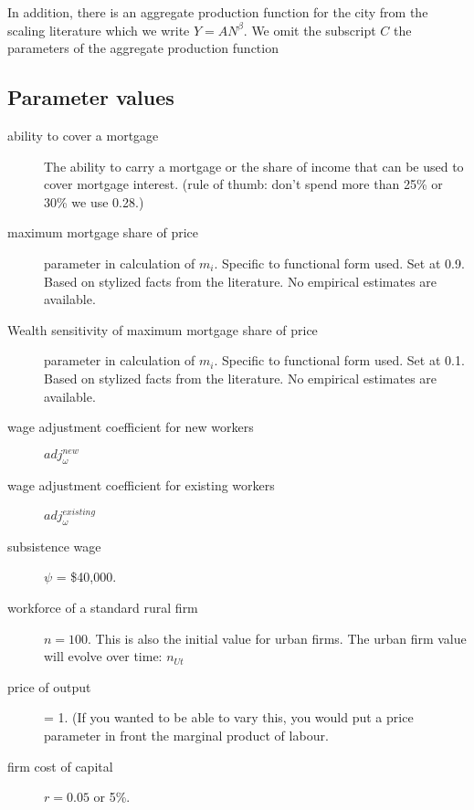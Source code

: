 In addition, there is an aggregate production function for the city from the scaling literature which we write $Y=AN^\beta$. We omit the subscript $C$  the parameters of the aggregate production function

\subsection{Parameter values} \label{sec-param-values}

\begin{description}

\item[\gls{ability to cover a mortgage}] The ability to carry a mortgage or the share of income that can be used to cover mortgage interest. (rule of thumb: don't spend more than 25\% or 30\% we use 0.28.)

\item[maximum mortgage share of price] parameter in calculation of $m_i$. Specific to functional form used. Set at 0.9. Based on stylized facts from the literature.  No empirical estimates are available. 

\item[Wealth sensitivity of maximum mortgage share of price] parameter in calculation of $m_i$. Specific to functional form used. Set at 0.1. Based on stylized facts from the literature.  No empirical estimates are available. 

\item[wage adjustment coefficient for new workers ] $adj^{new}_\omega$

\item[wage adjustment coefficient for existing workers] $adj^{existing}_\omega$

\item  [subsistence wage] $\psi$ = \$40,000. %

\item  [workforce of a standard rural firm] $n=100$. This is also the initial value for urban firms. The urban firm value will evolve over time: $n_{Ut}$ 

\item [price of output] = 1. (If you wanted to be able to vary this, you would put a price parameter in front the %
\gls{marginal product of labour}. %

\item [firm cost of capital] $r = 0.05$ or 5\%.


\end{description}
